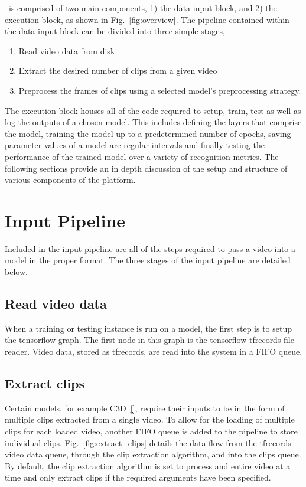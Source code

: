 \documentclass{llncs}
\begin{document}
\acro~is comprised of two main components, 1) the data input block, and 2) the execution block, as shown in Fig.~\ref{fig:overview}. 
The pipeline contained within the data input block can be divided into three simple stages,
\begin{enumerate}
\item Read video data from disk
\item Extract the desired number of clips from a given video
\item Preprocess the frames of clips using a selected model's preprocessing strategy.
\end{enumerate}
The execution block houses all of the code required to setup, train, test as well as log the outputs of a chosen model.
This includes defining the layers that comprise the model, training the model up to a predetermined number of epochs, saving parameter values of a model are regular intervals and finally testing the performance of the trained model over a variety of recognition metrics.
The following sections provide an in depth discussion of the setup and structure of various components of the platform.

\section{Input Pipeline}
\label{sec:ippipeline}
Included in the input pipeline are all of the steps required to pass a video into a model in the proper format.
The three stages of the input pipeline are detailed below.

\subsection{Read video data}
\label{sec:readdata}
When a training or testing instance is run on a model, the first step is to setup the tensorflow graph.
The first node in this graph is the tensorflow tfrecords file reader. 
Video data, stored as tfrecords, are read into the system in a FIFO queue.


\subsection{Extract clips}
\label{sec:extractclips}
Certain models, for example C3D~\ref{}, require their inputs to be in the form of multiple clips extracted from a single video.
To allow for the loading of multiple clips for each loaded video, another FIFO queue is added to the pipeline to store individual clips.
Fig.~\ref{fig:extract_clips} details the data flow from the tfrecords video data queue, through the clip extraction algorithm, and into the clips queue.
By default, the clip extraction algorithm is set to process and entire video at a time and only extract clips if the required arguments have been specified.
\end{document}
